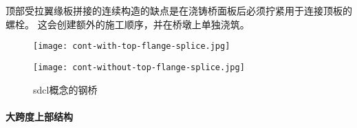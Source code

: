 顶部受拉翼缘板拼接的连续构造的缺点是在浇铸桥面板后必须拧紧用于连接顶板的螺栓。 这会创建额外的施工顺序，并在桥墩上单独浇筑。

\begin{figure}
  \begin{minipage}{0.48\linewidth}\centering
    \texttt{[image: cont-with-top-flange-splice.jpg]}
  \end{minipage}\hfill
  \begin{minipage}{0.48\linewidth}\centering
    \texttt{[image: cont-without-top-flange-splice.jpg]}
  \end{minipage}
  \caption{\acrshort*{sdcl}概念的钢桥}\label{fig:steel-bridge-system-SDCL}
\end{figure}

\paragraph{大跨度上部结构}

